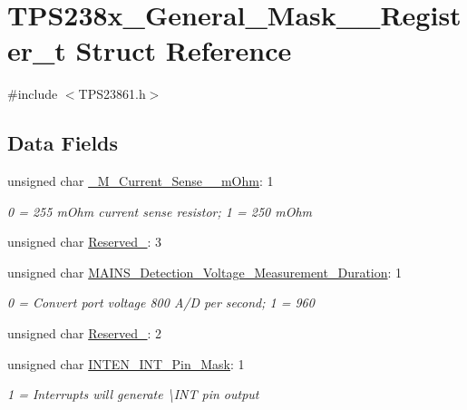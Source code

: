 \hypertarget{struct_t_p_s238x___general___mask__1___register__t}{\section{T\-P\-S238x\-\_\-\-General\-\_\-\-Mask\-\_\-\_\-\-Register\-\_\-t Struct Reference}
\label{struct_t_p_s238x___general___mask__1___register__t}
}


{\ttfamily \#include $<$T\-P\-S23861.\-h$>$}

\subsection*{Data Fields}
\begin{DoxyCompactItemize}
\item 
unsigned char \hyperlink{struct_t_p_s238x___general___mask__1___register__t_ac1633cafc6b7b26727c3ae9b1a318d35}{\-\_\-M\-\_\-\-Current\-\_\-\-Sense\-\_\-\_\-m\-Ohm}\-: 1
\begin{DoxyCompactList}\small\item\em 0 = 255 m\-Ohm current sense resistor; 1 = 250 m\-Ohm \end{DoxyCompactList}\item 
unsigned char \hyperlink{struct_t_p_s238x___general___mask__1___register__t_a1bbccb1bbf4b95fd4e19a7679b879ec2}{Reserved\-\_}\-: 3
\item 
unsigned char \hyperlink{struct_t_p_s238x___general___mask__1___register__t_a4ca38d0397f133021ee0abaeb61d7e66}{M\-A\-I\-N\-S\-\_\-\-Detection\-\_\-\-Voltage\-\_\-\-Measurement\-\_\-\-Duration}\-: 1
\begin{DoxyCompactList}\small\item\em 0 = Convert port voltage 800 A/\-D per second; 1 = 960 \end{DoxyCompactList}\item 
unsigned char \hyperlink{struct_t_p_s238x___general___mask__1___register__t_a4e50bf56b68810a410e31cfbb5e82735}{Reserved\-\_}\-: 2
\item 
unsigned char \hyperlink{struct_t_p_s238x___general___mask__1___register__t_a641d932c61c7a90f59cc887688e334a6}{I\-N\-T\-E\-N\-\_\-\-I\-N\-T\-\_\-\-Pin\-\_\-\-Mask}\-: 1
\begin{DoxyCompactList}\small\item\em 1 = Interrupts will generate \textbackslash{}I\-N\-T pin output \end{DoxyCompactList}\end{DoxyCompactItemize}


